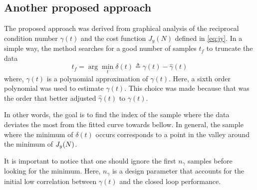 \subsection{Another proposed approach}

The proposed approach was derived from graphical analysis of the reciprocal condition number $\gamma(t)$ and the cost function $J_y(N)$ defined in \eqref{eq:jy}.
In a simple way, the method searches for a good number of samples $t_f$ to truncate the data
\begin{equation}
	t_f = \arg \min_t \delta(t) \triangleq \gamma(t) - \hat{\gamma}(t)
\label{eq:proposed_method}
\end{equation}
where, $\hat{\gamma}(t)$ is a polynomial approximation of $\gamma(t)$.
Here, a sixth order polynomial was used to estimate $\hat{\gamma}(t)$.
This choice was made because that was the order that better adjusted $\hat{\gamma}(t)$ to $\gamma(t)$.

In other words, the goal is to find the index of the sample where the data deviates the most from the fitted curve towards bellow.
In general, the sample where the minimum of $\delta(t)$ occurs corresponds to a point in the valley around the minimum of $J_y(N)$.

It is important to notice that one should ignore the first $n_\gamma$ samples before looking for the minimum.
Here, $n_\gamma$ is a design parameter that accounts for the initial low correlation between $\gamma(t)$ and the closed loop performance.
